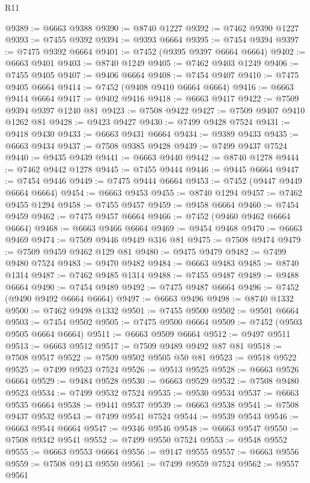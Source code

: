 \begin{lexlean}{R11}
\begin{coremodule}
@9389 := @6663 @9388
@9390 := @8740 @1227
@9392 := @7462 @9390 @1227
@9393 := @7455 @9392
@9394 := @9393 @6664
@9395 := @7454 @9394
@9397 := @7475 @9392 @6664
@9401 := @7452 (@9395 @9397 @6664 @6664)
@9402 := @6663 @9401
@9403 := @8740 @1249
@9405 := @7462 @9403 @1249
@9406 := @7455 @9405
@9407 := @9406 @6664
@9408 := @7454 @9407
@9410 := @7475 @9405 @6664
@9414 := @7452 (@9408 @9410 @6664 @6664)
@9416 := @6663 @9414 @6664
@9417 := @9402 @9416
@9418 := @6663 @9417
@9422 := @7509 @9394 @9397 @1240 @81
@9423 := @7508 @9422
@9427 := @7509 @9407 @9410 @1262 @81
@9428 := @9423 @9427
@9430 := @7499 @9428 @7524
@9431 := @9418 @9430
@9433 := @6663 @9431 @6664
@9434 := @9389 @9433
@9435 := @6663 @9434
@9437 := @7508 @9385 @9428
@9439 := @7499 @9437 @7524
@9440 := @9435 @9439
@9441 := @6663 @9440
@9442 := @8740 @1278
@9444 := @7462 @9442 @1278
@9445 := @7455 @9444
@9446 := @9445 @6664
@9447 := @7454 @9446
@9449 := @7475 @9444 @6664
@9453 := @7452 (@9447 @9449 @6664 @6664)
@9454 := @6663 @9453
@9455 := @8740 @1294
@9457 := @7462 @9455 @1294
@9458 := @7455 @9457
@9459 := @9458 @6664
@9460 := @7454 @9459
@9462 := @7475 @9457 @6664
@9466 := @7452 (@9460 @9462 @6664 @6664)
@9468 := @6663 @9466 @6664
@9469 := @9454 @9468
@9470 := @6663 @9469
@9474 := @7509 @9446 @9449 @316 @81
@9475 := @7508 @9474
@9479 := @7509 @9459 @9462 @129 @81
@9480 := @9475 @9479
@9482 := @7499 @9480 @7524
@9483 := @9470 @9482
@9484 := @6663 @9483
@9485 := @8740 @1314
@9487 := @7462 @9485 @1314
@9488 := @7455 @9487
@9489 := @9488 @6664
@9490 := @7454 @9489
@9492 := @7475 @9487 @6664
@9496 := @7452 (@9490 @9492 @6664 @6664)
@9497 := @6663 @9496
@9498 := @8740 @1332
@9500 := @7462 @9498 @1332
@9501 := @7455 @9500
@9502 := @9501 @6664
@9503 := @7454 @9502
@9505 := @7475 @9500 @6664
@9509 := @7452 (@9503 @9505 @6664 @6664)
@9511 := @6663 @9509 @6664
@9512 := @9497 @9511
@9513 := @6663 @9512
@9517 := @7509 @9489 @9492 @87 @81
@9518 := @7508 @9517
@9522 := @7509 @9502 @9505 @50 @81
@9523 := @9518 @9522
@9525 := @7499 @9523 @7524
@9526 := @9513 @9525
@9528 := @6663 @9526 @6664
@9529 := @9484 @9528
@9530 := @6663 @9529
@9532 := @7508 @9480 @9523
@9534 := @7499 @9532 @7524
@9535 := @9530 @9534
@9537 := @6663 @9535 @6664
@9538 := @9441 @9537
@9539 := @6663 @9538
@9541 := @7508 @9437 @9532
@9543 := @7499 @9541 @7524
@9544 := @9539 @9543
@9546 := @6663 @9544 @6664
@9547 := @9346 @9546
@9548 := @6663 @9547
@9550 := @7508 @9342 @9541
@9552 := @7499 @9550 @7524
@9553 := @9548 @9552
@9555 := @6663 @9553 @6664
@9556 := @9147 @9555
@9557 := @6663 @9556
@9559 := @7508 @9143 @9550
@9561 := @7499 @9559 @7524
@9562 := @9557 @9561

\end{coremodule}
\end{lexlean}
